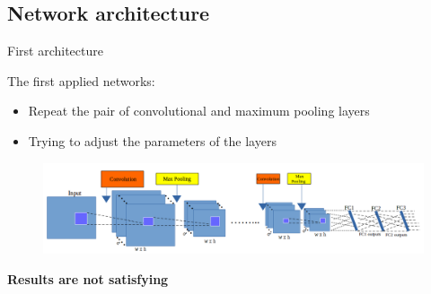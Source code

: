 \documentclass[10pt,svgnames]{beamer}
\begin{document}
\subsection{Network architecture}
\begin{frame}{First architecture}{}
	\begin{block}{The first applied networks:}
	\begin{itemize}
		\item Repeat the pair of {\color{conv}convolutional} and {\color{pool}maximum pooling} layers
		\item Trying to adjust the parameters of the layers
	\end{itemize}	
   	\end{block}
   	\begin{center}
   		\begin{figure}[htbp]
   			\centering
    		\includegraphics[scale=.28]{images/arch_cnn2}    
		\end{figure}
		\textbf{\color{red}Results are not satisfying}
   \end{center}
\end{frame}
\end{document}
